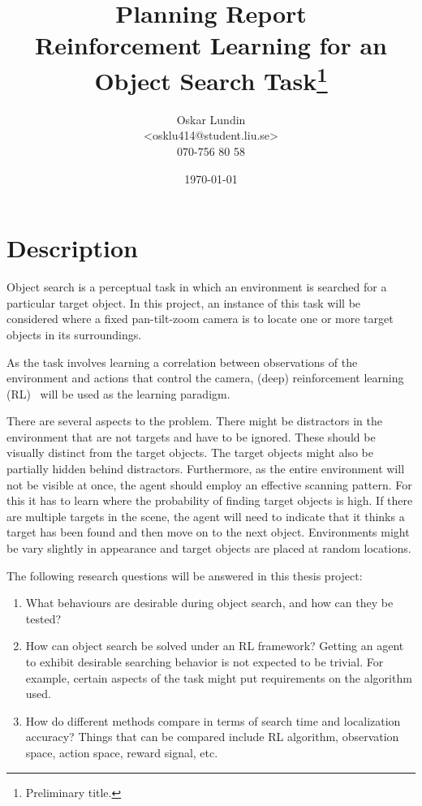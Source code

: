 \documentclass{article}
\title{Planning Report \\ \large Reinforcement Learning for an Object Search Task\footnote{Preliminary title.}}
\author{Oskar Lundin\\<osklu414@student.liu.se>\\070-756 80 58}
\date{\today}
\begin{document}
\maketitle

\section{Description}

Object search is a perceptual task in which an environment is searched for a particular target object. In this project, an instance of this task will be considered where a fixed pan-tilt-zoom camera is to locate one or more target objects  in its surroundings.

As the task involves learning a correlation between observations of the environment and actions that control the camera, (deep) reinforcement learning (RL)~\cite{sutton2018} will be used as the learning paradigm.

There are several aspects to the problem. There might be distractors in the environment that are not targets and have to be ignored. These should be visually distinct from the target objects. The target objects might also be partially hidden behind distractors. Furthermore, as the entire environment will not be visible at once, the agent should employ an effective scanning pattern. For this it has to learn where the probability of finding target objects is high. If there are multiple targets in the scene, the agent will need to indicate that it thinks a target has been found and then move on to the next object. Environments might be vary slightly in appearance and target objects are placed at random locations.

\noindent
The following research questions will be answered in this thesis project:

\begin{enumerate}
    \item What behaviours are desirable during object search, and how can they be tested?
    \item How can object search be solved under an RL framework? Getting an agent to exhibit desirable searching behavior is not expected to be trivial. For example, certain aspects of the task might put requirements on the algorithm used. 
    \item How do different methods compare in terms of search time and localization accuracy? Things that can be compared include RL algorithm, observation space, action space, reward signal, etc.
\end{enumerate}
\end{document}
